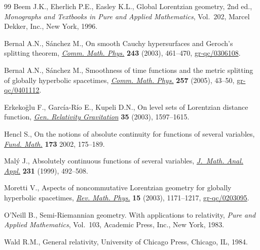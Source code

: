\documentclass[11pt]{article}
\begin{document}
\begin{thebibliography}{99}
Beem J.K., Eherlich P.E., Easley K.L.,
Global Lorentzian geometry,  2nd ed., {\it Monographs and Textbooks in Pure and Applied Mathematics}, Vol.~202, Marcel Dekker, Inc., New York, 1996.

Bernal A.N., S\'anchez M.,
On smooth Cauchy hypersurfaces and Geroch's splitting theorem,
\href{http://dx.doi.org/10.1007/s00220-003-0982-6}{{\it Comm. Math. Phys.}} {\bf 243} (2003), 461--470,
\href{http://www.arxiv.org/abs/gr-qc/0306108}{gr-qc/0306108}.

Bernal A.N., S\'anchez M.,
Smoothness of time functions and the metric splitting of globally hyperbolic spacetimes,
\href{http://dx.doi.org/10.1007/s00220-005-1346-1}{{\it Comm. Math. Phys.}} {\bf 257} (2005), 43--50,
\href{http://www.arxiv.org/abs/gr-qc/0401112}{gr-qc/0401112}.

Erkeko\u{g}lu F., Garc\'ia-R\'io E., Kupeli D.N.,
On level sets of Lorentzian distance function,
\href{http://dx.doi.org/10.1023/A:1025779017980}{{\it Gen. Relativity Gravitation}} {\bf 35} (2003), 1597--1615.

Hencl S.,
On the notions of absolute continuity for functions of several variables,
\href{http://dx.doi.org/10.4064/fm173-2-5}{{\it Fund. Math.}} {\bf 173} 2002, 175--189.

Mal\'y J.,
Absolutely continuous functions of several variables,
\href{http://dx.doi.org/10.1006/jmaa.1998.6246}{{\it J.~Math. Anal. Appl.}} {\bf 231} (1999), 492--508.

Moretti V.,
Aspects of noncommutative Lorentzian geometry for globally hyperbolic spacetimes,
\href{http://dx.doi.org/10.1142/S0129055X03001886}{{\it Rev. Math. Phys.}} {\bf 15} (2003), 1171--1217,
\href{http://arxiv.org/abs/gr-qc/0203095}{gr-qc/0203095}.

O'Neill B.,
Semi-Riemannian geometry. With applications to relativity,
 {\it Pure and Applied Mathematics}, Vol.~103, Academic Press, Inc., New York, 1983.

Wald R.M.,
General relativity,  University of Chicago Press, Chicago, IL, 1984.

\end{thebibliography}
\end{document}
